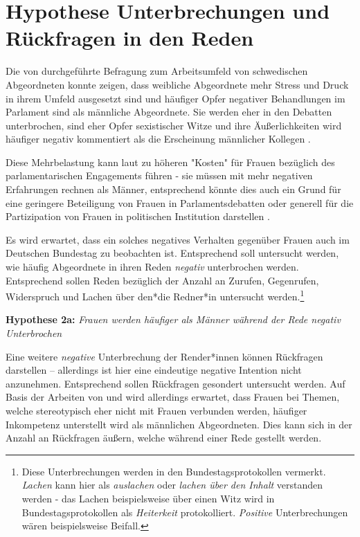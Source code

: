 \documentclass[12pt, 
    twoside=false, 
    bibliography=totoc, 
    numbers=endperiod, 
    headings=normal, 
    toc=chapterentrydotfill
    ]{scrbook}
\begin{document}
\section{Hypothese Unterbrechungen und Rückfragen in den Reden}

Die von \textcite{erikson_2018} durchgeführte Befragung zum Arbeitsumfeld von schwedischen Abgeordneten konnte zeigen, dass weibliche Abgeordnete mehr Stress und Druck in ihrem Umfeld ausgesetzt sind und häufiger Opfer negativer Behandlungen im Parlament sind als männliche Abgeordnete. Sie werden eher in den Debatten unterbrochen, sind eher Opfer sexistischer Witze und ihre Äußerlichkeiten wird häufiger negativ kommentiert als die Erscheinung männlicher Kollegen \parencite[13]{erikson_2018}.

Diese Mehrbelastung kann laut \textcite{erikson_2018} zu höheren "Kosten" für Frauen bezüglich des parlamentarischen Engagements führen - sie müssen mit mehr negativen Erfahrungen rechnen als Männer, entsprechend könnte dies auch ein Grund für eine geringere Beteiligung von Frauen in Parlamentsdebatten oder generell für die Partizipation von Frauen in politischen Institution darstellen \parencites[vgl.][]{erikson_2018}[vgl.][]{back_2014}.

Es wird erwartet, dass ein solches negatives Verhalten gegenüber Frauen auch im Deutschen Bundestag zu beobachten ist. Entsprechend soll untersucht werden, wie häufig Abgeordnete in ihren Reden \emph{negativ} unterbrochen werden. Entsprechend sollen Reden bezüglich der Anzahl an Zurufen, Gegenrufen, Widerspruch und Lachen über den*die Redner*in untersucht werden.\footnote{Diese Unterbrechungen werden in den Bundestagsprotokollen vermerkt. \emph{Lachen} kann hier als \emph{auslachen} oder \emph{lachen über den Inhalt} verstanden werden - das Lachen beispielsweise über einen Witz wird in Bundestagsprotokollen als \emph{Heiterkeit} protokolliert. \emph{Positive} Unterbrechungen wären beispielsweise Beifall.}

\textbf{Hypothese 2a:} \emph{Frauen werden häufiger als Männer während der Rede negativ Unterbrochen}

Eine weitere \emph{negative} Unterbrechung der Render*innen können Rückfragen darstellen -- allerdings ist hier eine eindeutige negative Intention nicht anzunehmen. Entsprechend sollen Rückfragen gesondert untersucht werden. Auf Basis der Arbeiten von \textcite{brescoll_2011} und \textcite{eagly_2002}  wird allerdings erwartet, dass Frauen bei Themen, welche stereotypisch eher nicht mit Frauen verbunden werden, häufiger Inkompetenz unterstellt wird als männlichen Abgeordneten. Dies kann sich in der Anzahl an Rückfragen äußern, welche während einer Rede gestellt werden. 
\end{document}
